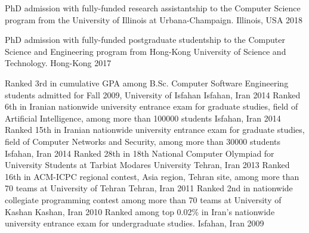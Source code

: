 
\begin{cvhonors}

  \cvhonor
    {PhD admission}
    {with fully-funded research assistantship to the Computer Science program from the University of Illinois at Urbana-Champaign.}
    {Illinois, USA}
    {2018}
    
  \cvhonor
    {PhD admission}
    {with fully-funded postgraduate studentship to the Computer Science and Engineering program from Hong-Kong University of Science and Technology.}
    {Hong-Kong}
    {2017}
    
  \cvhonor
    {Ranked 3rd}
    {in cumulative GPA among B.Sc. Computer Software Engineering students admitted for Fall 2009, University of Isfahan
}
    {Isfahan, Iran}
    {2014}
  \cvhonor
    {Ranked 6th}
    {in Iranian nationwide university entrance exam for graduate studies, field
of Artificial Intelligence, among more than 100000 students}
    {Isfahan, Iran}
    {2014}
  \cvhonor
    {Ranked 15th}
    {in Iranian nationwide university entrance exam for graduate studies, field
of Computer Networks and Security, among more than 30000 students}
    {Isfahan, Iran}
    {2014}
    \cvhonor
    {Ranked 28th}
    {in 18th National Computer Olympiad for University Students at Tarbiat Modares University}
    {Tehran, Iran}
    {2013}
    \cvhonor
    {Ranked 16th}
    {in ACM-ICPC regional contest, Asia region, Tehran site, among more than 70 teams at University of Tehran}
    {Tehran, Iran}
    {2011}
    \cvhonor
    {Ranked 2nd}
    {in nationwide collegiate programming contest among more than 70 teams at University of Kashan}
    {Kashan, Iran}
    {2010}
    \cvhonor
    {Ranked among top 0.02\%}
    {in Iran's nationwide university entrance exam for undergraduate studies.}
    {Isfahan, Iran}
    {2009}
\end{cvhonors}
